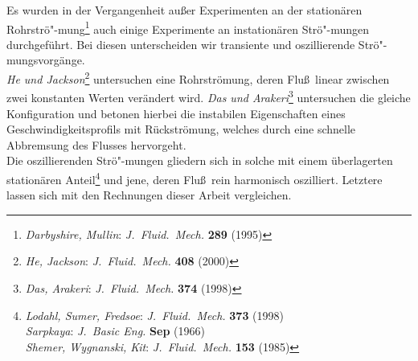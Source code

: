 \documentclass[10pt,a5paper,oneside,draft]{book}
\numberwithin{equation}{chapter}
\def\bibspace{\hspace*{18pt}}
\def\bibspace{\hspace*{21pt}}
\begin{document}
Es wurden in der Vergangenheit au\ss er Experimenten an der station\"aren Rohrstr\"o"-mung\footnote{\label{bib:darbyshire_mullin}\textsl{Darbyshire, Mullin}: \textit{J.\ Fluid.\ Mech.} \textbf{289} (1995)}
auch einige Experimente an instation\"aren Str\"o"-mungen durchgef\"uhrt.
Bei diesen unterscheiden wir transiente und oszillierende Str\"o"-mungsvorg\"ange.\\
\textsl{He und Jackson}\footnote{\label{bib:he_jackson}\textsl{He, Jackson}: \textit{J.\ Fluid.\ Mech.} \textbf{408} (2000)}
untersuchen eine Rohrstr\"omung, deren Flu\ss\ linear zwischen zwei konstanten Werten ver\"andert wird.
\textsl{Das und Arakeri}\footnote{\label{bib:das_arakeri}\textsl{Das, Arakeri}: \textit{J.\ Fluid.\ Mech.} \textbf{374} (1998)}
untersuchen die gleiche Konfiguration und betonen hierbei die instabilen Eigenschaften eines Geschwindigkeitsprofils mit R\"uckstr\"omung, welches durch eine schnelle Abbremsung des Flusses hervorgeht.\\
Die oszillierenden Str\"o"-mungen gliedern sich in solche mit einem \"uberlagerten station\"aren Anteil\footnote{\label{bib:lodahl_sumer}\textsl{Lodahl, Sumer, Fredsoe}: \textit{J.\ Fluid.\ Mech.} \textbf{373} (1998)\\\bibspace\label{bib:sarpkaya}\textsl{Sarpkaya}: \textit{J.\ Basic Eng.} \textbf{Sep} (1966)\\\bibspace\label{bib:shemer_wygnanski}\textsl{Shemer, Wygnanski, Kit}: \textit{J.\ Fluid.\ Mech.} \textbf{153} (1985)}
und jene, deren Flu\ss\ rein harmonisch oszilliert.
Letztere lassen sich mit den Rechnungen dieser Arbeit vergleichen.\\
\end{document}
